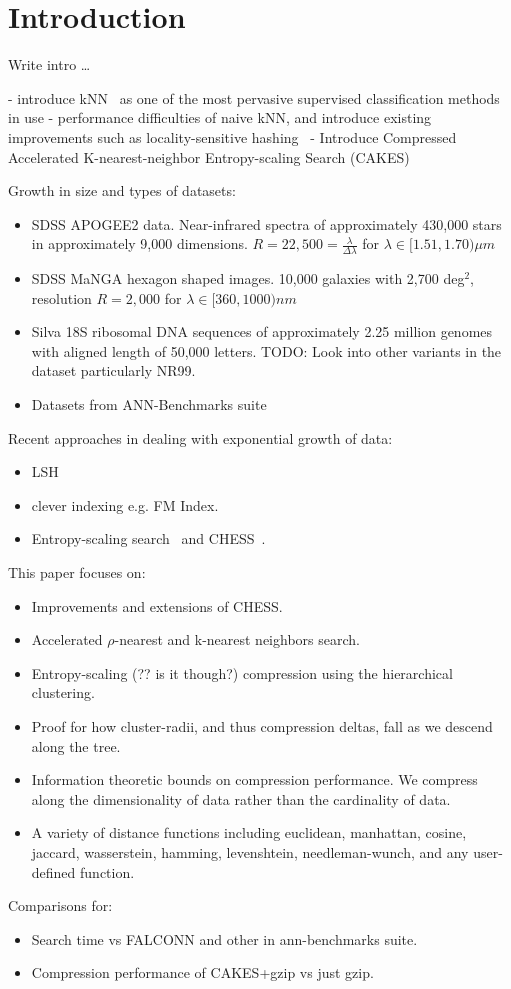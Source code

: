 \section{Introduction}
\label{sec:introduction}

Write intro \dots

- introduce kNN~\cite{fix1952discriminatory, cover1967nearest} as one of the most pervasive supervised classification methods in use
- performance difficulties of naive kNN, and introduce existing improvements such as locality-sensitive hashing~\cite{bingham2001random}
- Introduce Compressed Accelerated K-nearest-neighbor Entropy-scaling Search (CAKES)

Growth in size and types of datasets:
\begin{itemize}
    \item SDSS APOGEE2 data. Near-infrared spectra of approximately 430,000 stars in approximately 9,000 dimensions. $R=22,500 = \frac{\lambda}{\Delta \lambda}$ for $\lambda \in [1.51, 1.70) \mu m$
    \item SDSS MaNGA hexagon shaped images. 10,000 galaxies with 2,700 deg$^2$, resolution $R=2,000$ for $\lambda \in [360, 1000) nm$
    \item Silva 18S ribosomal DNA sequences of approximately 2.25 million genomes with aligned length of 50,000 letters. TODO: Look into other variants in the dataset particularly NR99.
    \item Datasets from ANN-Benchmarks suite
\end{itemize}

Recent approaches in dealing with exponential growth of data:
\begin{itemize}
    \item LSH
    \item clever indexing e.g. FM Index.
    \item Entropy-scaling search~\cite{yu2015entropy} and CHESS~\cite{ishaq2019clustered}.
\end{itemize}

This paper focuses on:
\begin{itemize}
    \item Improvements and extensions of CHESS.
    \item Accelerated $\rho$-nearest and k-nearest neighbors search.
    \item Entropy-scaling (?? is it though?) compression using the hierarchical clustering.
    \item Proof for how cluster-radii, and thus compression deltas, fall as we descend along the tree.
    \item Information theoretic bounds on compression performance. We compress along the dimensionality of data rather than the cardinality of data.
    \item A variety of distance functions including euclidean, manhattan, cosine, jaccard, wasserstein, hamming, levenshtein, needleman-wunch, and any user-defined function.
\end{itemize}

Comparisons for:
\begin{itemize}
    \item Search time vs FALCONN and other in ann-benchmarks suite.
    \item Compression performance of CAKES+gzip vs just gzip.
\end{itemize}
